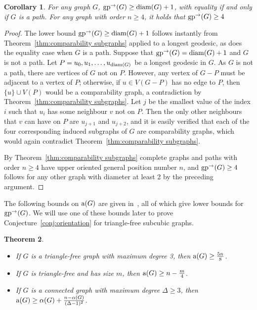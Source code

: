 \documentclass[a4paper,12pt]{article}
\newtheorem{theorem}{Theorem}[section]
\newtheorem{corollary}[theorem]{Corollary}
\theoremstyle{definition}
\newcommand{\ac}{{\rm a}}
\newcommand{\diam}{{\rm diam}}
\newcommand{\ugp}{{\rm gp^{\rightarrow }}}
\begin{document}
	\begin{corollary}\label{cor:diam bound}
		For any graph $G$, $\ugp (G) \geq \diam (G)+1$, with equality if and only if $G$ is a path. For any graph with order $n \geq 4$, it holds that $\ugp(G) \geq 4$
	\end{corollary}
	\begin{proof}
		The lower bound $\ugp (G) \geq \diam (G)+1$ follows instantly from Theorem~\ref{thm:comparability subgraphs} applied to a longest geodesic, as does the equality case when $G$ is a path. Suppose that $\ugp (G) = \diam (G)+1$ and $G$ is not a path. Let $P = u_0,u_1,\ldots ,u_{\diam (G)}$ be a longest geodesic in $G$. As $G$ is not a path, there are vertices of $G$ not on $P$. However, any vertex of $G-P$ must be adjacent to a vertex of $P$; otherwise, if $u \in V(G-P)$ has no edge to $P$, then $\{ u\} \cup V(P)$ would be a comparability graph, a contradiction by Theorem~\ref{thm:comparability subgraphs}. Let $j$ be the smallest value of the index $i$ such that $u_i$ has some neighbour $v$ not on $P$. Then the only other neighbours that $v$ can have on $P$ are $u_{j+1}$ and $u_{j+2}$, and it is easily verified that each of the four corresponding induced subgraphs of $G$ are comparability graphs, which would again contradict Theorem~\ref{thm:comparability subgraphs}. 
		
		By Theorem~\ref{thm:comparability subgraphs} complete graphs and paths with order $n \geq 4$ have upper oriented general position number $n$, and $\ugp (G) \geq 4$ follows for any other graph with diameter at least 2 by the preceding argument.
	\end{proof}
	
	The following bounds on $\ac (G)$ are given in~\cite{Alon}, all of which give lower bounds for $\ugp (G)$. We will use one of these bounds later to prove Conjecture~\ref{conj:orientation} for triangle-free subcubic graphs.
	
	\begin{theorem}{\rm \cite{Alon}}\label{thm:Alon}
		\text{ }
		\begin{itemize}
			\item If $G$ is a triangle-free graph with maximum degree 3, then $\ac (G) \geq \frac{5n}{8}$.
			\item If $G$ is triangle-free and has size $m$, then $\ac (G) \geq n-\frac{m}{4}$.
			\item If $G$ is a connected graph with maximum degree $\Delta \geq 3$, then $\ac (G) \geq \alpha (G) +\frac{n-\alpha (G)}{(\Delta -1)^2}$.
			
		\end{itemize}
	\end{theorem}
	
\end{document}
